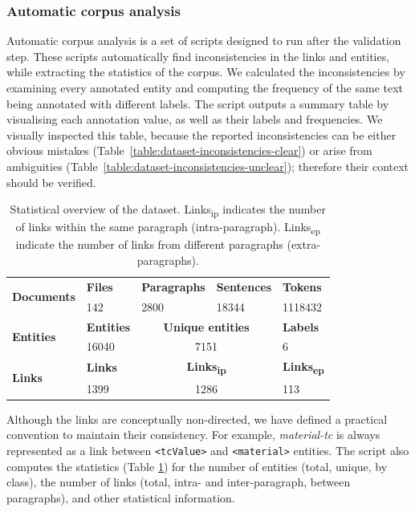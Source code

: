 \subsubsection{Automatic corpus analysis}
Automatic corpus analysis is a set of scripts designed to run after the validation step. 
These scripts automatically find inconsistencies in the links and entities, while extracting the statistics of the corpus. 
We calculated the inconsistencies by examining every annotated entity and computing the frequency of the same text being annotated with different labels. 
The script outputs a summary table by visualising each annotation value, as well as their labels and frequencies.
We visually inspected this table, because the reported inconsistencies can be either obvious mistakes (Table~\ref{table:dataset-inconsistencies-clear}) or arise from ambiguities (Table~\ref{table:dataset-inconsistencies-unclear}); therefore their context should be verified. 

\begin{table}[ht]
    \caption{Statistical overview of the dataset. 
    Links\textsubscript{ip} indicates the number of links within the same paragraph (intra-paragraph). Links\textsubscript{ep} indicate the number of links from different paragraphs  (extra-paragraphs).  }
    \begin{tabular}{ m{6em}   m{4em}  m{6em}  m{7em}  m{6em} } 
    \toprule
        \multirow{2}{5em}{\textbf{Documents}} & \textbf{Files} & \textbf{Paragraphs} &	\textbf{Sentences} & \textbf{Tokens}\\
         & 142  &	2800 & 	18344 & 	1118432\\
    \midrule
        \multirow{2}{5em}{\textbf{Entities}} & \textbf{Entities} &  \multicolumn{2}{|c|}{\textbf{Unique entities}} &  \textbf{ Labels} \\
        & 16040 &  \multicolumn{2}{c}{7151} &  6 \\
    \midrule
        \multirow{2}{5em}{\textbf{Links}} & \textbf{Links} & \multicolumn{2}{|c|}{\textbf{Links\textsubscript{ip}}} 
        & \textbf{Links\textsubscript{ep}}\\
        & 1399  & \multicolumn{2}{c}{1286} &	113	\\
    \bottomrule
    \end{tabular}
    \label{table:summary-content}
\end{table}

Although the links are conceptually non-directed, we have defined a practical convention to maintain their consistency. For example, \textit{material-tc} is always represented as a link between \texttt{<tcValue>} and \texttt{<material>} entities. 
The script also computes the statistics (Table \ref{table:summary-content}) for the number of entities (total, unique, by class), the number of links (total, intra- and inter-paragraph, between paragraphs), and other statistical information. 

